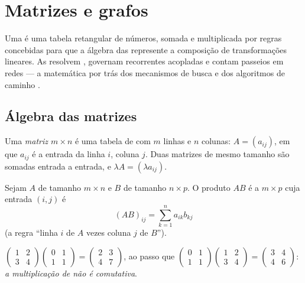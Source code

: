 \chapter{Matrizes e grafos}\label{ch:g12:matrix}

Uma  é uma tabela retangular de números, somada e multiplicada por
regras concebidas para que a álgebra das  represente a composição
de transformações lineares. As  resolvem ,
governam  recorrentes acopladas e contam passeios em redes ---
a matemática por trás dos mecanismos de busca e dos algoritmos de caminho
.

\section{Álgebra das matrizes}

\begin{definition}[Matriz]\label{def:g12:matrix:matrix}
Uma \emph{matriz $m \times n$} é uma tabela de 
com $m$ linhas e $n$ colunas:
$A = (a_{ij})$, em que $a_{ij}$ é a entrada da linha $i$, coluna $j$.
Duas matrizes de mesmo tamanho são somadas entrada a entrada, e
$\lambda A = (\lambda a_{ij})$.
\end{definition}

\begin{definition}\label{def:g12:matrix:product}
Sejam $A$ de tamanho $m \times n$ e $B$ de tamanho $n \times p$. O produto
$AB$ é a  $m \times p$ cuja entrada $(i,j)$ é
\[
(AB)_{ij} = \sum_{k=1}^{n} a_{ik} b_{kj}
\]
(a regra ``linha $i$ de $A$ vezes coluna $j$ de $B$'').
\end{definition}

\begin{example}
$\begin{pmatrix} 1 & 2\\ 3 & 4\end{pmatrix}
\begin{pmatrix} 0 & 1\\ 1 & 1\end{pmatrix}
= \begin{pmatrix} 2 & 3\\ 4 & 7\end{pmatrix}$,
\quad ao passo que \quad
$\begin{pmatrix} 0 & 1\\ 1 & 1\end{pmatrix}
\begin{pmatrix} 1 & 2\\ 3 & 4\end{pmatrix}
= \begin{pmatrix} 3 & 4\\ 4 & 6\end{pmatrix}$:
\emph{a multiplicação de  não é comutativa}.
\end{example}

